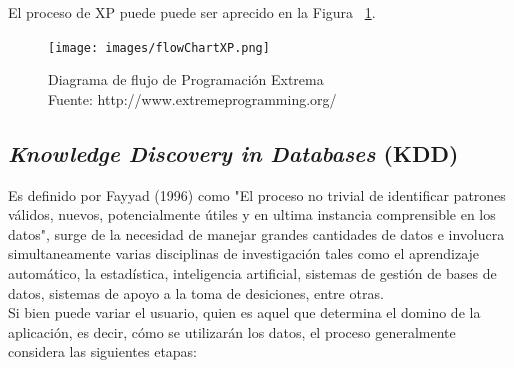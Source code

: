 El proceso de XP puede puede ser aprecido en la Figura ~\ref{fig:procesoXP}.

\begin{figure}[!ht]
	\centering
	\captionsetup{justification=centering}
	\texttt{[image: images/flowChartXP.png]}
	\caption[Diagrama de flujo de Programación Extrema.]{Diagrama de flujo de Programación Extrema\\Fuente: http://www.extremeprogramming.org/}
	\label{fig:procesoXP}
\end{figure}

\subsection{\textit{Knowledge Discovery in Databases} (KDD)}

Es definido por Fayyad (1996) como "El proceso no trivial de identificar patrones válidos, nuevos, potencialmente útiles y en ultima instancia comprensible en los datos", surge de la necesidad de manejar grandes cantidades de datos e involucra simultaneamente varias disciplinas de investigación tales como el aprendizaje automático, la estadística, inteligencia artificial, sistemas de gestión de bases de datos, sistemas de apoyo a la toma de desiciones, entre otras.\\
Si bien puede variar el usuario, quien es aquel que determina el domino de la aplicación, es decir, cómo se utilizarán los datos, el proceso generalmente considera las siguientes etapas:
